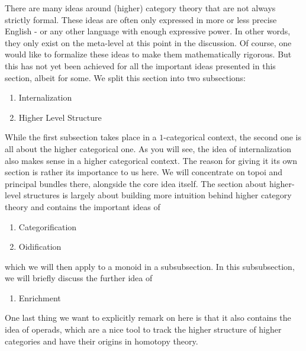 There are many ideas around (higher) category theory that are not always strictly formal.
These ideas are often only expressed in more or less precise English - or any other language with enough expressive power.
In other words, they only exist on the meta-level at this point in the discussion.
Of course, one would like to formalize these ideas to make them mathematically rigorous.
But this has not yet been achieved for all the important ideas presented in this section, albeit for some.
We split this section into two subsections:
\begin{enumerate}
\item[$\bullet$]
Internalization
\item[$\bullet$]
Higher Level Structure
\end{enumerate}
While the first subsection takes place in a $1$-categorical context, the second one is all about the higher categorical one.
As you will see, the idea of internalization also makes sense in a higher categorical context.
The reason for giving it its own section is rather its importance to us here.
We will concentrate on topoi and principal bundles there, alongside the core idea itself.
The section about higher-level structures is largely about building more intuition behind higher category theory and contains the important ideas of
\begin{enumerate}
\item[$\bullet$]
Categorification
\item[$\bullet$]
Oidification
\end{enumerate}
which we will then apply to a monoid in a subsubsection.
In this subsubsection, we will briefly discuss the further idea of
\begin{enumerate}
\item[$\bullet$]
Enrichment
\end{enumerate}
One last thing we want to explicitly remark on here is that it also contains the idea of operads, which are a nice tool to track the higher structure of higher categories and have their origins in homotopy theory.
